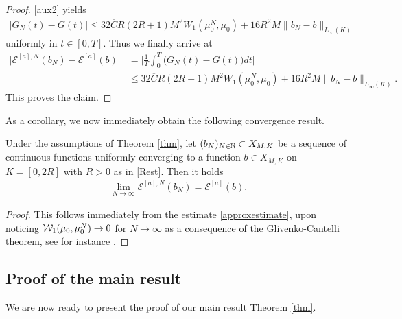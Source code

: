 \begin{proof}
	\eqref{aux2} yields
	\begin{align*}
		|G_N(t)-G(t)|
			\leq 32\overline{C}R(2R+1)M^2 W_1(\mu_0^N,\mu_0)+16R^2M\| b_{N}-b\|_{L_\infty(K)}
	\end{align*}
	uniformly in $t \in [0,T]$. Thus we finally arrive at
	\begin{align*}
		\bigl|\mathcal E^{[a],N}(b_N)-\mathcal E^{[a]}(b)\bigr|
			&=\biggl|\frac{1}{T}\int^T_0\bigl(G_N(t)-G(t)\bigr)dt\biggr|\\
			&\leq 32\overline{C}R(2R+1)M^2 W_1(\mu_0^N,\mu_0)+16R^2M\| b_{N}-b\|_{L_\infty(K)}.
	\end{align*}
	This proves the claim.

\end{proof}









As a corollary, we now immediately obtain the following convergence result.

\begin{lemma}\label{lemma-semicontinuous-1}
	Under the assumptions of Theorem \ref{thm}, let $(b_N)_{N \in \mathbb{N}}\subset X_{M,K}$ be a sequence of continuous functions
	uniformly converging to a function $b \in X_{M,K}$ on $K=[0,2R]$  with $R>0$ as in \eqref{Rest}.
	Then it holds
	\begin{align*}
		\lim_{N\rightarrow\infty} \mathcal E^{[a],N}(b_{N})= \mathcal E^{[a]}(b).
	\end{align*}
\end{lemma}

\begin{proof}
	This follows immediately from the estimate \eqref{approxestimate}, upon noticing
	$\mathcal{W}_1(\mu_0,\mu^N_0) \rightarrow 0$ for $N \rightarrow \infty$ as a consequence of the Glivenko-Cantelli theorem,
see for instance \cite[Lemma 3.3]{fornahuetter}.
\end{proof}

\subsection{Proof of the main result}

We are now ready to present the proof of our main result Theorem \ref{thm}.


